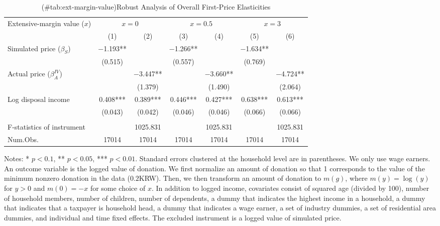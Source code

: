 \begin{table}

\caption{(\#tab:ext-margin-value)Robust Analysis of Overall First-Price Elasticities}
\centering
\fontsize{8}{10}\selectfont
\begin{threeparttable}
\begin{tabular}[t]{lcccccc}
\toprule
\multicolumn{1}{c}{Extensive-margin value ($x$)} & \multicolumn{2}{c}{$x = 0$} & \multicolumn{2}{c}{$x = 0.5$} & \multicolumn{2}{c}{$x = 3$} \\
\cmidrule(l{3pt}r{3pt}){1-1} \cmidrule(l{3pt}r{3pt}){2-3} \cmidrule(l{3pt}r{3pt}){4-5} \cmidrule(l{3pt}r{3pt}){6-7}
  & (1) & (2) & (3) & (4) & (5) & (6)\\
\midrule
Simulated price ($\beta_S$) & \num{-1.193}** &  & \num{-1.266}** &  & \num{-1.634}** & \\
 & (\num{0.515}) &  & (\num{0.557}) &  & (\num{0.769}) & \\
Actual price ($\beta^{IV}_A$) &  & \num{-3.447}** &  & \num{-3.660}** &  & \num{-4.724}**\\
 &  & (\num{1.379}) &  & (\num{1.490}) &  & (\num{2.064})\\
Log disposal income & \num{0.408}*** & \num{0.389}*** & \num{0.446}*** & \num{0.427}*** & \num{0.638}*** & \num{0.613}***\\
 & (\num{0.043}) & (\num{0.042}) & (\num{0.046}) & (\num{0.046}) & (\num{0.066}) & (\num{0.066})\\
\midrule
\addlinespace[0.3em]
\multicolumn{7}{l}{\textit{1st stage information (Excluded instrument: Simulated price)}}\\
\hspace{1em}F-statistics of instrument &  & \num{1025.831} &  & \num{1025.831} &  & \num{1025.831}\\
Num.Obs. & \num{17014} & \num{17014} & \num{17014} & \num{17014} & \num{17014} & \num{17014}\\
\bottomrule
\end{tabular}
\begin{tablenotes}
\item Notes: * $p < 0.1$, ** $p < 0.05$, *** $p < 0.01$. Standard errors clustered at the household level are in parentheses. We only use wage earners. An outcome variable is the logged value of donation. We first normalize an amount of donation so that 1 corresponds to the value of the minimum nonzero donation in the data ($0.2$KRW). Then, we then transform an amount of donation to $m(g)$, where $m(y) = \log(y)$ for $y > 0$ and $m(0) = -x$ for some choice of $x$. In addition to logged income, covariates consist of squared age (divided by 100), number of household members, number of children, number of dependents, a dummy that indicates the highest income in a household, a dummy that indicates that a taxpayer is household head, a dummy that indicates a wage earner, a set of industry dummies, a set of residential area dummies, and individual and time fixed effects. The excluded instrument is a logged value of simulated price.
\end{tablenotes}
\end{threeparttable}
\end{table}
